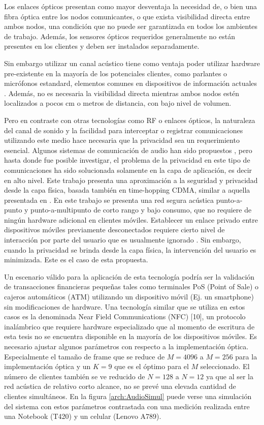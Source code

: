 Los enlaces ópticos presentan como mayor desventaja la necesidad de, o bien una fibra óptica entre los nodos comunicantes, o que exista visibilidad directa entre ambos nodos, una condición que no puede ser garantizada en todos los ambientes de trabajo. Además, los sensores ópticos requeridos generalmente no están presentes en los clientes y deben ser instalados separadamente.

Sin embargo utilizar un canal acústico tiene como ventaja poder utilizar hardware pre-existente en la mayoría de los potenciales clientes, como parlantes o micrófonos estandard, elementos comunes en dispositivos de información actuales \cite{citeulike:12800468}. Además, no es necesaria la visibilidad directa mientras ambos nodos estén localizados a pocos cm o metros de distancia, con bajo nivel de volumen.

Pero en contraste con otras tecnologías como RF o enlaces ópticos, la naturaleza del canal de sonido y la facilidad para interceptar o registrar comunicaciones utilizando este medio hace necesaria que la privacidad sea un requerimiento esencial. Algunos sistemas de comunicación de audio han sido propuestos \cite{august2002apparatus}, pero hasta donde fue posible investigar, el problema de la privacidad en este tipo de comunicaciones ha sido solucionada solamente en la capa de aplicación, es decir en alto nivel. Este trabajo presenta una aproximación a la seguridad y privacidad desde la capa física, basada también en time-hopping CDMA, similar a aquella presentada en \cite{6476559}. En este trabajo se presenta una red segura acústica punto-a-punto y punto-a-multipunto de corto rango y bajo consumo, que no requiere de ningún hardware adicional en clientes móviles.
Establecer un enlace privado entre dispositivos móviles previamente desconectados requiere cierto nivel de interacción por parte del usuario que es usualmente ignorado \cite{4912753}. Sin embargo, cuando la privacidad se brinda desde la capa física, la intervención del usuario es minimizada. Este es el caso de esta propuesta.

Un escenario válido para la aplicación de esta tecnología podría ser la validación de transacciones financieras pequeñas tales como terminales PoS (Point of Sale) o cajeros automáticos (ATM) utilizando un dispositivo móvil (Ej. un smartphone) sin modificaciones de hardware. Una tecnología similar que se utiliza en estos casos es la denominada Near Field Communications (NFC) [10], un protocolo inalámbrico que requiere hardware especializado que al momento de escritura de esta tesis no se encuentra disponible en la mayoría de los dispositivos móviles.
Es necesario ajustar algunos parámetros con respecto a la implementación óptica. Especialmente el tamaño de frame que se reduce de $M=4096$ a $M=256$ para la implementación óptica y un $K=9$ que es el óptimo para el $M$ seleccionado. El número de clientes también se ve reducido de $N=128$ a $N=12$ ya que al ser la red acústica de relativo corto alcance, no se prevé una elevada cantidad de clientes simultáneos. En la figura \ref{arch:AudioSimul} puede verse una simulación del sistema con estos parámetros contrastada con una medición realizada entre una Notebook (T420) y un celular (Lenovo A789).

